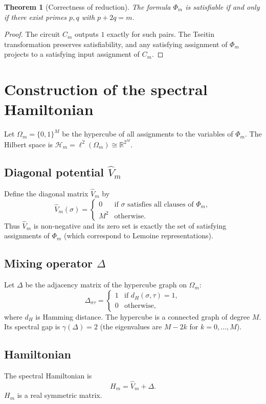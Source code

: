\documentclass[11pt,a4paper]{article}
\newtheorem{theorem}{Theorem}[section]
\begin{document}
\begin{theorem}[Correctness of reduction]\label{thm:reduction}
The formula \(\Phi_m\) is satisfiable if and only if there exist primes \(p,q\) with \(p+2q=m\).
\end{theorem}
\begin{proof}
The circuit \(C_m\) outputs \(1\) exactly for such pairs. The Tseitin transformation preserves satisfiability, and any satisfying assignment of \(\Phi_m\) projects to a satisfying input assignment of \(C_m\).
\end{proof}

\section{Construction of the spectral Hamiltonian}

Let \(\Omega_m = \{0,1\}^M\) be the hypercube of all assignments to the variables of \(\Phi_m\). The Hilbert space is \(\mathcal{H}_m = \ell^2(\Omega_m) \cong \mathbb{R}^{2^M}\).

\subsection{Diagonal potential \(\hat{V}_m\)}
Define the diagonal matrix \(\hat{V}_m\) by
\[
\hat{V}_m(\sigma) = 
\begin{cases}
0 & \text{if }\sigma\text{ satisfies all clauses of } \Phi_m,\\
M^2 & \text{otherwise}.
\end{cases}
\]
Thus \(\hat{V}_m\) is non‑negative and its zero set is exactly the set of satisfying assignments of \(\Phi_m\) (which correspond to Lemoine representations).

\subsection{Mixing operator \(\Delta\)}
Let \(\Delta\) be the adjacency matrix of the hypercube graph on \(\Omega_m\):
\[
\Delta_{\sigma\tau} = \begin{cases}
1 & \text{if } d_H(\sigma,\tau)=1,\\
0 & \text{otherwise},
\end{cases}
\]
where \(d_H\) is Hamming distance. The hypercube is a connected graph of degree \(M\). Its spectral gap is \(\gamma(\Delta)=2\) (the eigenvalues are \(M-2k\) for \(k=0,\dots,M\)).

\subsection{Hamiltonian}
The spectral Hamiltonian is
\[
H_m = \hat{V}_m + \Delta.
\]
\(H_m\) is a real symmetric matrix.
\end{document}
